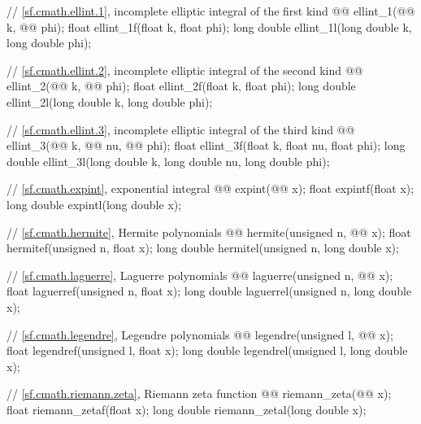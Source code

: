 \begin{codeblock}
{  // \ref{sf.cmath.ellint.1}, incomplete elliptic integral of the first kind
  @@ ellint_1(@@ k, @@ phi);
  float               ellint_1f(float k, float phi);
  long double         ellint_1l(long double k, long double phi);

  // \ref{sf.cmath.ellint.2}, incomplete elliptic integral of the second kind
  @@ ellint_2(@@ k, @@ phi);
  float               ellint_2f(float k, float phi);
  long double         ellint_2l(long double k, long double phi);

  // \ref{sf.cmath.ellint.3}, incomplete elliptic integral of the third kind
  @@ ellint_3(@@ k, @@ nu,
                               @@ phi);
  float               ellint_3f(float k, float nu, float phi);
  long double         ellint_3l(long double k, long double nu, long double phi);

  // \ref{sf.cmath.expint}, exponential integral
  @@ expint(@@ x);
  float               expintf(float x);
  long double         expintl(long double x);

  // \ref{sf.cmath.hermite}, Hermite polynomials
  @@ hermite(unsigned n, @@ x);
  float               hermitef(unsigned n, float x);
  long double         hermitel(unsigned n, long double x);

  // \ref{sf.cmath.laguerre}, Laguerre polynomials
  @@ laguerre(unsigned n, @@ x);
  float               laguerref(unsigned n, float x);
  long double         laguerrel(unsigned n, long double x);

  // \ref{sf.cmath.legendre}, Legendre polynomials
  @@ legendre(unsigned l, @@ x);
  float               legendref(unsigned l, float x);
  long double         legendrel(unsigned l, long double x);

  // \ref{sf.cmath.riemann.zeta}, Riemann zeta function
  @@ riemann_zeta(@@ x);
  float               riemann_zetaf(float x);
  long double         riemann_zetal(long double x);

}
\end{codeblock}

